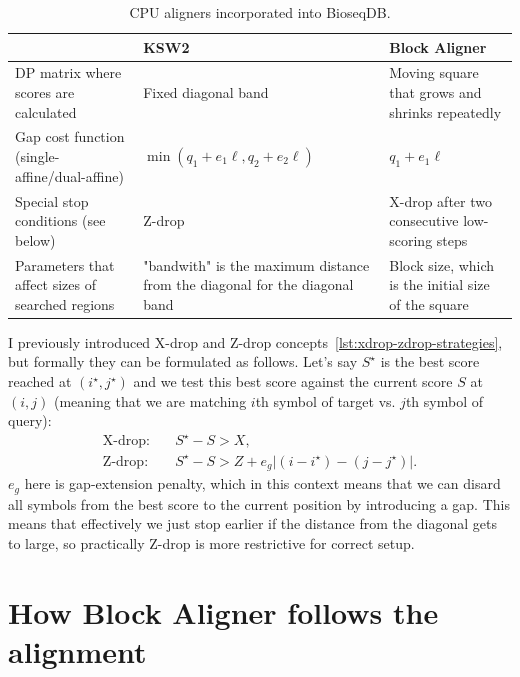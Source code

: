 \begin{table}[H]
\centering
\small
\caption{CPU aligners incorporated into BioseqDB.}
\label{tab:final-aligner-comparison}
\setlength{\tabcolsep}{4pt}
\renewcommand{\arraystretch}{1.1}
\begin{tabularx}{\linewidth}{@{}>{\raggedright\arraybackslash}p{.19\linewidth}
  >{\raggedright\arraybackslash}X >{\raggedright\arraybackslash}X@{}}
\toprule
 & \textbf{KSW2} & \textbf{Block Aligner}\\
\midrule
DP matrix where scores are calculated & Fixed diagonal band & Moving square that grows and shrinks repeatedly \\
Gap cost function (single-affine/dual-affine)& \(\min(q_1+e_1\ell,q_2+e_2\ell)\) & \(q_1+e_1\ell\)\\
Special stop conditions (see below) & Z-drop & X-drop after two consecutive low-scoring steps\\
Parameters that affect sizes of searched regions & "bandwith" is the maximum distance from the diagonal for the diagonal band
 & Block size, which is the initial size of the square \\
\bottomrule
\end{tabularx}
\end{table}

I previously introduced X-drop and Z-drop concepts~\ref{lst:xdrop-zdrop-strategies}, but formally they can be formulated as follows.
Let's say \(S^\star\) is the best score reached at \((i^\star,j^\star)\) and we test this best score against the
current score \(S\) at \((i,j)\) (meaning that we are matching $i$th symbol of target vs. $j$th symbol of query):
\begin{equation}
\begin{aligned}
  \text{X-drop:}\quad&S^\star-S>X,\\
  \text{Z-drop:}\quad&S^\star-S>Z+e_{g}\left|(i-i^\star)-(j-j^\star)\right|.
\end{aligned}
\label{eq:zdrop}
\end{equation}
$e_{g}$ here is gap-extension penalty, which in this context means that we can disard all symbols from the best score to the current position by introducing a gap. This means 
that effectively we just stop earlier if the distance from the diagonal gets to large, so practically Z-drop is more restrictive for correct setup.

\clearpage
\section{How Block Aligner follows the alignment}
\label{sec:final-alignment-block}

